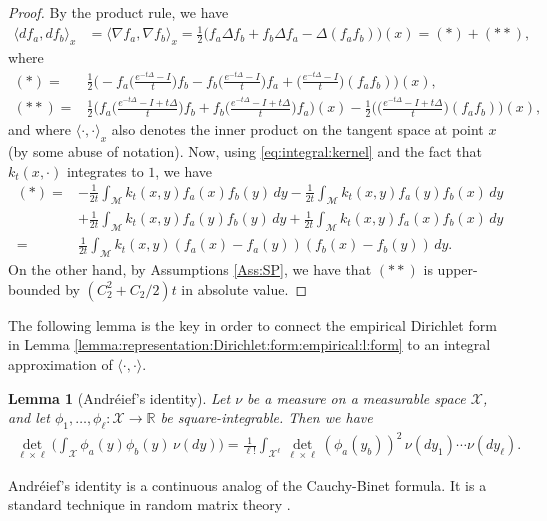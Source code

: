 \documentclass[10pt]{article}
\theoremstyle{plain}
\newtheorem{lemma}{Lemma}
\theoremstyle{definition}
\theoremstyle{remark}
\begin{document}
\begin{proof}
    By the product rule, we have
    \begin{align}\label{eq:chain:rule}
        \langle df_a,df_b\rangle_x&=\langle \nabla f_a,\nabla f_b\rangle_x=\frac{1}{2}\big(f_a\Delta f_b+f_b\Delta f_a-\Delta(f_af_b)\big)(x)=(*)+(**),
    \end{align}
    where 
    \begin{align*}
        (*)=&\frac{1}{2}\Big(-f_a\Big(\frac{e^{-t\Delta}-I}{t}\Big)f_b-f_b\Big(\frac{e^{-t\Delta}-I}{t}\Big)f_a+\Big(\frac{e^{-t\Delta}-I}{t}\Big)(f_af_b)\Big)(x),\\
        (**)=&\frac{1}{2}\Big(f_a\Big(\frac{e^{-t\Delta}-I+t\Delta}{t}\Big)f_b+f_b\Big(\frac{e^{-t\Delta}-I+t\Delta}{t}\Big)f_a\Big)(x)
        -\frac{1}{2}\Big(\Big(\frac{e^{-t\Delta}-I+t\Delta}{t}\Big)(f_af_b)\Big)(x),
    \end{align*}
    and where $\langle\cdot,\cdot\rangle_x$ also denotes the inner product on the tangent space at point $x$ (by some abuse of notation).
    Now, using \eqref{eq:integral:kernel} and the fact that $k_t(x,\cdot)$ integrates to $1$, we have
    \begin{align*}
        (*)=&-\frac{1}{2t}\int_{\mathcal{M}}k_t(x,y)f_a(x)f_b(y)\,dy-\frac{1}{2t}\int_{\mathcal{M}}k_t(x,y)f_a(y)f_b(x)\,dy\\
        &+\frac{1}{2t}\int_{\mathcal{M}}k_t(x,y)f_a(y)f_b(y)\,dy+\frac{1}{2t}\int_{\mathcal{M}}k_t(x,y)f_a(x)f_b(x)\,dy\\
        =&\frac{1}{2t}\int_\mathcal{M}k_t(x,y)(f_a(x)-f_a(y))(f_b(x)-f_b(y))\,dy.
    \end{align*}
    On the other hand, by Assumptions \ref{Ass:SP}, we have that $(**)$ is upper-bounded by $(C_2^2+C_2/2)t$ in absolute value.
\end{proof}

The following lemma is the key in order to connect the empirical Dirichlet form in Lemma \ref{lemma:representation:Dirichlet:form:empirical:l:form} to an integral approximation of $\langle\cdot,\cdot \rangle$. 

\begin{lemma}[Andréief's identity]\label{andreief:identity} Let $\nu$ be a measure on a measurable space $\mathcal{X}$, and let $\phi_1,\dots,\phi_\ell:\mathcal{X}\rightarrow \mathbb{R}$ be square-integrable. Then we have
\begin{align*}
    \det_{\ell\times \ell}\Big(\int_\mathcal{X}\phi_a(y)\phi_b(y)\,\nu(dy)\Big)=\frac{1}{\ell!}\int_{\mathcal{X}^\ell}\det_{\ell\times \ell}\left(\phi_a(y_b)\right)^2\,\nu(dy_1)\cdots \nu(dy_\ell).
\end{align*}
\end{lemma}
Andréief's identity is a continuous analog of the Cauchy-Binet formula. It is a standard technique in random matrix theory \cite{Con05}. 
\end{document}
